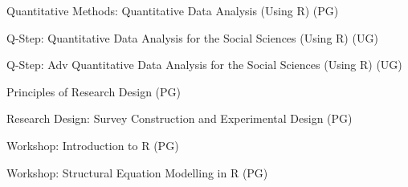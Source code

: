 \documentclass[12pt]{article}
\newcommand{\halfblankline}{\quad\vspace{-0.5\baselineskip}\pagebreak[3]}
\begin{document}
\begin{innerlist}
        \item[] Quantitative Methods: Quantitative Data Analysis (Using R) (PG)
    	        	\begin{innerlist}
        		    	\item[] [SP09, SP10, SP11, SP12, SP13, SP14, AU17, AU18, AU19, AU20, AU21]
        		    \end{innerlist}
    	\item[] Q-Step: Quantitative Data Analysis for the Social Sciences (Using R) (UG)
    	        	\begin{innerlist}
        		    	\item[] [AU15, AU16, AU17, AU18, AU19, AU20]
        		    \end{innerlist}
        \item[] Q-Step: Adv Quantitative Data Analysis for the Social Sciences (Using R)  (UG)
    	        	\begin{innerlist}
        		    	\item[] [AU16 - 50\%]
        		    \end{innerlist}
        \item[] Principles of Research Design (PG)
        		    \begin{innerlist}
        		    	\item[] [AU09, AU13, SP19, SP20, SP21]
        		    \end{innerlist}
        \item[] Research Design: Survey Construction and Experimental Design (PG)
    	        	\begin{innerlist}
        		    	\item[] [SU10, AU11]
        		    \end{innerlist}
        \item[] Workshop: Introduction to R (PG)
    	        	\begin{innerlist}
        		    	\item[] [AU18, SP19, AU20]
        		    \end{innerlist}		
        \item[] Workshop: Structural Equation Modelling in R (PG)
    	        	\begin{innerlist}
        		    	\item[] [SP17, SP21]
        		    \end{innerlist}			
    \end{innerlist}

\halfblankline
\end{document}
